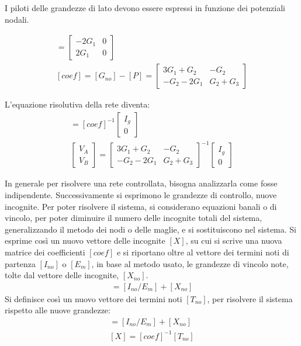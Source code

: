 \documentclass{article}
\numberwithin{equation}{subsection}
\begin{document}
I piloti delle grandezze di lato devono essere espressi in funzione dei potenziali nodali. 

\begin{gather*}
    [P]=\begin{bmatrix}
        -2G_1&0\\
        2G_1&0
    \end{bmatrix}\\
    [{coef}]=[G_{no}]-[P]=\begin{bmatrix}
        3G_1+G_2&-G_2\\
        -G_2-2G_1&G_2+G_3
    \end{bmatrix}
\end{gather*}

L'equazione risolutiva della rete diventa:
\begin{gather*}
    [V_{no}]=[coef]^{-1}\begin{bmatrix}
        I_g\\
        0
    \end{bmatrix}\\
    \begin{bmatrix}
        V_A\\
        V_B
    \end{bmatrix}=
    \begin{bmatrix}
        3G_1+G_2&-G_2\\
        -G_2-2G_1&G_2+G_3
    \end{bmatrix}^{-1}\begin{bmatrix}
        I_g\\
        0
    \end{bmatrix}
\end{gather*}


In generale per risolvere una rete controllata, bisogna analizzarla come fosse indipendente. Successivamente si esprimono le grandezze di controllo, nuove 
incognite. Per poter risolvere il sistema, si considerano equazioni banali o di vincolo, per poter diminuire il numero delle incognite totali del sistema, generalizzando il 
metodo dei nodi o delle maglie, e si sostituiscono nel sistema. Si esprime così un nuovo vettore delle incognite $[X]$, su cui si scrive una nuova matrice 
dei coefficienti $[coef]$ e si riportano oltre al vettore dei termini noti di partenza $[I_{no}]$ o $[E_m]$, in base al metodo usato, le grandezze di vincolo note, tolte dal 
vettore delle incognite, $[X_{no}]$. 
\begin{gather*}
    [coef][X]=[I_{no}/E_m]+[X_{no}]
\end{gather*}
Si definisce così un nuovo vettore dei termini noti $[T_{no}]$, per risolvere il sistema rispetto alle nuove grandezze:
\begin{gather*}
    [T_{no}]=[I_{no}/E_m]+[X_{no}]\\
    [X]=[coef]^{-1}[T_{no}]
\end{gather*}
\end{document}
